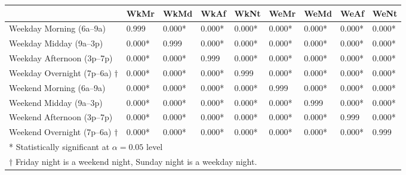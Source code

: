 \begin{footnotesize}
\begin{tabular}{p{3cm} | l l l l l l l l}
& WkMr & WkMd & WkAf & WkNt & WeMr & WeMd & WeAf & WeNt \\
\hline
Weekday Morning (6a--9a)   & 0.999 & 0.000* & 0.000* & 0.000* & 0.000* & 0.000* & 0.000* & 0.000* \\
Weekday Midday (9a--3p)    & 0.000* & 0.999 & 0.000* & 0.000* & 0.000* & 0.000* & 0.000* & 0.000* \\
Weekday Afternoon (3p--7p) & 0.000* & 0.000* & 0.999 & 0.000* & 0.000* & 0.000* & 0.000* & 0.000* \\
Weekday Overnight (7p--6a) $\dagger$ & 0.000* & 0.000* & 0.000* & 0.999 & 0.000* & 0.000* & 0.000* & 0.000* \\
Weekend Morning (6a--9a)   & 0.000* & 0.000* & 0.000* & 0.000* & 0.999 & 0.000* & 0.000* & 0.000* \\
Weekend Midday (9a--3p)    & 0.000* & 0.000* & 0.000* & 0.000* & 0.000* & 0.999 & 0.000* & 0.000* \\
Weekend Afternoon (3p--7p) & 0.000* & 0.000* & 0.000* & 0.000* & 0.000* & 0.000* & 0.999 & 0.000* \\
Weekend Overnight (7p--6a) $\dagger$ & 0.000* & 0.000* & 0.000* & 0.000* & 0.000* & 0.000* & 0.000* & 0.999 \\
\hline
\multicolumn{9}{l}{* Statistically significant at $\alpha = 0.05$ level} \\
\multicolumn{9}{l}{$\dagger$ Friday night is a weekend night, Sunday night is a weekday night.} \\
\end{tabular}
\end{footnotesize}
